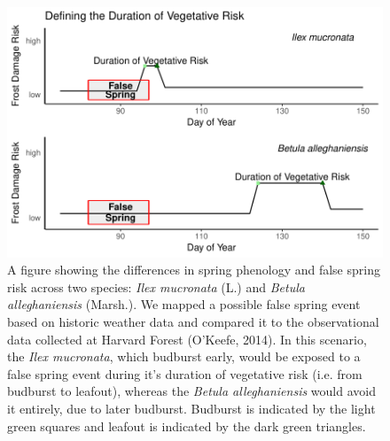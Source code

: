 \documentclass{article}\usepackage[]{graphicx}\usepackage[]{color}
\makeatletter
\def\maxwidth{ %
  \ifdim\Gin@nat@width>\linewidth
    \linewidth
  \else
    \Gin@nat@width
  \fi
}
\makeatother
\begin{document}
\begin{figure}[H]

{\centering \includegraphics[width=\maxwidth]{figure/risk-1} 

}

\caption{A figure showing the differences in spring phenology and false spring risk across two species: \textit{Ilex mucronata} (L.) and \textit{Betula alleghaniensis} (Marsh.). We mapped a possible false spring event based on historic weather data and compared it to the observational data collected at Harvard Forest (O'Keefe, 2014). In this scenario, the \textit{Ilex mucronata}, which budburst early, would be exposed to a false spring event during it's duration of vegetative risk (i.e. from budburst to leafout), whereas the \textit{Betula alleghaniensis} would avoid it entirely, due to later budburst. Budburst is indicated by the light green squares and leafout is indicated by the dark green triangles.}\label{fig:risk}
\end{figure}
\end{document}
